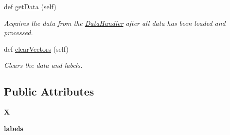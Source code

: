 \begin{DoxyCompactItemize}
def \mbox{\hyperlink{classDataHandler_1_1DataHandler_a336c25a9d3bc421cb8c83cc06a146cf4}{get\+Data}} (self)
\begin{DoxyCompactList}\small\item\em Acquires the data from the \mbox{\hyperlink{classDataHandler_1_1DataHandler}{Data\+Handler}} after all data has been loaded and processed. \end{DoxyCompactList}\item 
\mbox{\label{classDataHandler_1_1DataHandler_a8b64033a8c413e3a0962cad27361fb32}} 
def \mbox{\hyperlink{classDataHandler_1_1DataHandler_a8b64033a8c413e3a0962cad27361fb32}{clear\+Vectors}} (self)
\begin{DoxyCompactList}\small\item\em Clears the data and labels. \end{DoxyCompactList}\end{DoxyCompactItemize}
\subsection*{Public Attributes}
\begin{DoxyCompactItemize}
\item 
\mbox{\label{classDataHandler_1_1DataHandler_a01c6dc2a40afc7363333f88d30b4fbd8}} 
{\bfseries X}
\item 
\mbox{\label{classDataHandler_1_1DataHandler_aac4283e57cbf9a6d45497c8ff74a3315}} 
{\bfseries labels}
\end{DoxyCompactItemize}
